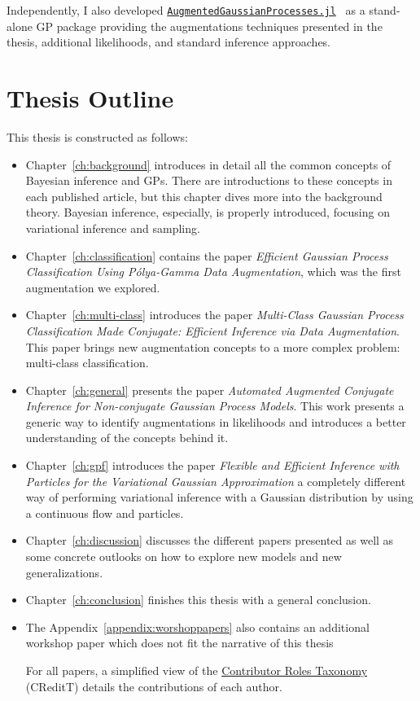 Independently, I also developed \href{https://github.com/theogf/AugmentedGaussianProcesses.jl}{\texttt{AugmentedGaussianProcesses.jl}}~\cite{theo_galy_fajou_2021_5728215} as a stand-alone \ac{GP} package providing the augmentations techniques presented in the thesis, additional likelihoods, and standard inference approaches.

\section{Thesis Outline}

This thesis is constructed as follows:
\begin{itemize}
    \item Chapter~\ref{ch:background} introduces in detail all the common concepts of Bayesian inference and \ac{GPs}.
    There are introductions to these concepts in each published article, but this chapter dives more into the background theory.
    Bayesian inference, especially, is properly introduced, focusing on variational inference and sampling.
    \item Chapter~\ref{ch:classification} contains the paper \textit{Efficient Gaussian Process Classification Using P\'olya-Gamma Data Augmentation}, which was the first augmentation we explored.
    \item Chapter~\ref{ch:multi-class} introduces the paper \textit{Multi-Class Gaussian Process Classification Made Conjugate: Efficient Inference via Data Augmentation}.
    This paper brings new augmentation concepts to a more complex problem: multi-class classification.
    \item Chapter~\ref{ch:general} presents the paper \textit{Automated Augmented Conjugate Inference for Non-conjugate Gaussian Process Models}.
    This work presents a generic way to identify augmentations in likelihoods and introduces a better understanding of the concepts behind it.
    \item Chapter~\ref{ch:gpf} introduces the paper \textit{Flexible and Efficient Inference with Particles for the Variational Gaussian Approximation } a completely different way of performing variational inference with a Gaussian distribution by using a continuous flow and particles.
    \item Chapter~\ref{ch:discussion} discusses the different papers presented as well as some concrete outlooks on how to explore new models and new generalizations.
    \item Chapter~\ref{ch:conclusion} finishes this thesis with a general conclusion.
    \item The Appendix~\ref{appendix:worshoppapers} also contains an additional workshop paper which does not fit the narrative of this thesis 

    For all papers, a simplified view of the \href{https://mdpi-res.com/data/contributor-role-instruction.pdf}{Contributor Roles Taxonomy} (CReditT) details the contributions of each author.

\end{itemize}


